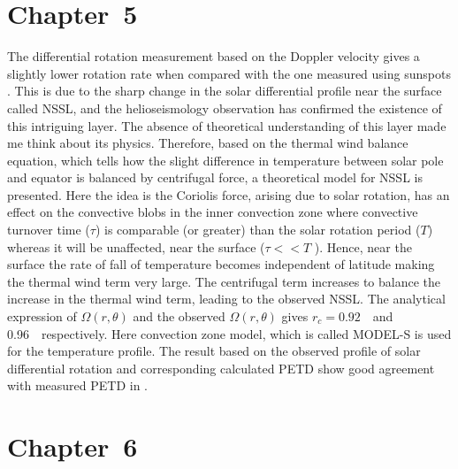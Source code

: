 \section{Chapter~5}
%
The differential rotation measurement based on the Doppler velocity \cite{Howard1970} gives a slightly lower rotation rate when compared with the one measured using sunspots \citep[\cref{Chap4}, and ][]{Beck2000, Jha2021}.  This is due to the sharp change in the solar differential profile near the surface called NSSL, and the helioseismology observation has confirmed the existence of this intriguing layer. The absence of theoretical understanding of this layer made me think about its physics. Therefore, based on the thermal wind balance equation, which tells how the slight difference in temperature between solar pole and equator is balanced by centrifugal force, a theoretical model for NSSL is presented. Here the idea is the Coriolis force, arising due to solar rotation, has an effect on the convective blobs in the inner convection zone where convective turnover time ($\tau$) is comparable (or greater) than the solar rotation period ($T$) whereas it will be unaffected, near the surface ($\tau<<T$ ). Hence, near the surface the rate of fall of temperature becomes independent of latitude making the thermal wind term very large. The centrifugal term increases to balance the increase in the thermal wind term, leading to the observed NSSL. The analytical expression of $\Omega (r,\theta) $ and the observed $\Omega (r, \theta)$ gives $r_c=0.92$~\Rsun\ and 0.96~\Rsun\ respectively. Here convection zone model, which is called MODEL-S \citep{Dalsgaard1996} is used for the temperature profile. The result based on the observed profile of solar differential rotation and corresponding calculated PETD show good agreement with measured PETD in \citet{Rast2008}.



\section{Chapter~6}

